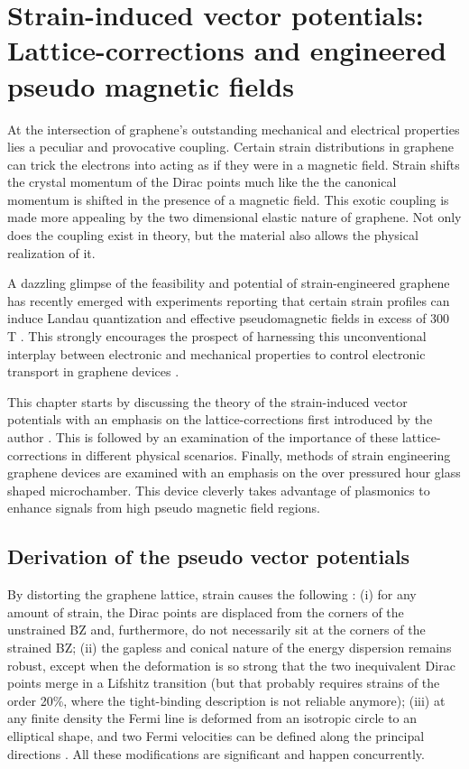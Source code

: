 \chapter{Strain-induced vector potentials: Lattice-corrections and engineered pseudo magnetic fields\label{chap:PVP}}

At the intersection of graphene's outstanding mechanical and electrical properties lies a peculiar and provocative coupling.
Certain strain distributions in graphene can trick the electrons into acting as if they were in a magnetic field.
Strain shifts the crystal momentum of the Dirac points much like the the canonical momentum is shifted in the presence of a magnetic field.
This exotic coupling is made more appealing by the two dimensional elastic nature of graphene.
Not only does the coupling exist in theory, but the material also allows the physical realization of it.

A dazzling glimpse of the feasibility and potential of strain-engineered graphene \cite{Pereira2009a,Guinea2009} has recently emerged with experiments reporting that certain strain profiles can induce Landau quantization and effective pseudomagnetic fields in excess of 300 T \cite{Levy2010,Yan2012,Yeh2011}.
This strongly encourages the prospect of harnessing this unconventional interplay between electronic and mechanical properties to control electronic transport in graphene devices \cite{Pereira2009a,Fogler2008}.

This chapter starts by discussing the theory of the strain-induced vector potentials with an emphasis on the lattice-corrections first introduced by the author \cite{Kitt2012,Kitt2013}.
This is followed by an examination of the importance of these lattice-corrections in different physical scenarios.
Finally, methods of strain engineering graphene devices are examined with an emphasis on the over pressured hour glass shaped microchamber.
This device cleverly takes advantage of plasmonics to enhance signals from high pseudo magnetic field regions.

\section{Derivation of the pseudo vector potentials}

By distorting the graphene lattice, strain causes the following \cite{Pereira2009}:
(i) for any amount of strain, the Dirac points are displaced from the corners of the unstrained BZ and, furthermore, do not necessarily sit at the corners of the strained BZ;
(ii) the gapless and conical nature of the energy dispersion remains robust, except when the deformation is so strong that the two inequivalent Dirac points merge in a Lifshitz transition (but that probably requires strains of the order 20\%, where the tight-binding description is not reliable anymore);
(iii) at any finite density the Fermi line is deformed from an isotropic circle to an elliptical shape, and two Fermi velocities can be defined along the principal directions \cite{Pereira2009,Pereira2010c,Choi2010}.
All these modifications are significant and happen concurrently. 

